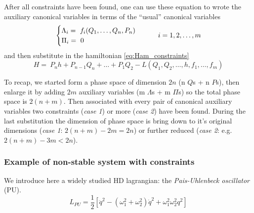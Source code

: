 After all constraints have been found, one can use these equation to wrote the
auxiliary canonical variables in terms of the ``usual'' canonical variables
\begin{equation} \label{eq:constraints_in_terms_of_canonical_vars}
  \begin{cases}
    \Lambda_i =\ f_i(Q_1, \ldots, Q_n, P_n) \\
    \Pi_i =\ 0
  \end{cases}
  \qquad i = 1, 2, \ldots, m \\
\end{equation}
and then substitute in the hamiltonian \eqref{eq:Ham_constraints}
\begin{equation*}
  H =\ P_n h + P_{n-1} Q_n + \ldots + P_1 Q_2
     - L ( Q_1, Q_2, \ldots, h, f_1, \ldots, f_m)
\end{equation*}

To recap, we started form a phase space of dimension $2n$ (n $Q$s + n $P$s),
then enlarge it by adding $2m$ auxiliary variables (m $\Lambda$s + m $\Pi$s) so
the total phase space is $2(n+m)$. Then associated with every pair of canonical
auxiliary variables two constraints (\emph{case 1}) or more (\emph{case 2}) have
been found.  During the last substitution the dimension of phase space is bring
down to it's original dimensions (\emph{case 1}: $2(n+m) - 2m = 2n$) or further
reduced (\emph{case 2}: e.g. $2(n+m) - 3m < 2n$).

\subsubsection{Example of non-stable system with constraints}
We introduce here a widely studied HD lagrangian: the
\emph{Pais-Uhlenbeck oscillator} (PU).
\begin{equation} \label{eq:lagrangian_PU}
  L_{PU} = \frac{1}{2} \left[
    \ddot{q}^2 - (\omega_1^2 + \omega_2^2) \dot{q}^2 + \omega_1^2 \omega_2^2 q^2
  \right]
\end{equation}

